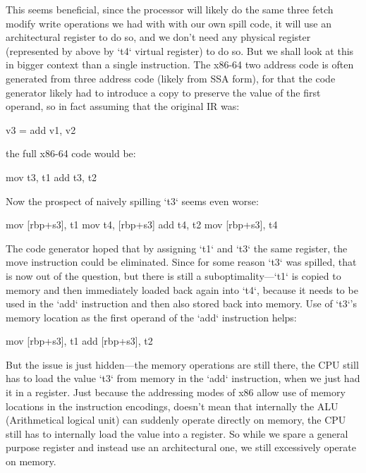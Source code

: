This seems beneficial, since the processor will likely do the same three fetch modify
write operations we had with with our own spill code, it will use an
architectural register to do so, and we don't need any physical register
(represented by above by `t4` virtual register) to do so. But we shall look at
this in bigger context than a single instruction. The x86-64 two address code is
often generated from three address code (likely from SSA form), for that the
code generator likely had to introduce a copy to preserve the value of the first
operand, so in fact assuming that the original IR was:

\begtt
v3 = add v1, v2
\endtt

the full x86-64 code would be:

\begtt
mov t3, t1
add t3, t2
\endtt

Now the prospect of naively spilling `t3` seems even worse:

\begtt
mov [rbp+s3], t1
mov t4, [rbp+s3]
add t4, t2
mov [rbp+s3], t4
\endtt

The code generator hoped that by assigning `t1` and `t3` the same register, the
move instruction could be eliminated. Since for some reason `t3` was spilled,
that is now out of the question, but there is still a suboptimality---`t1` is
copied to memory and then immediately loaded back again into `t4`, because it
needs to be used in the `add` instruction and then also stored back into memory.
Use of `t3`'s memory location as the first operand of the `add` instruction
helps:

\begtt
mov [rbp+s3], t1
add [rbp+s3], t2
\endtt

But the issue is just hidden---the memory operations are still
there, the CPU still has to load the value `t3` from memory in the `add`
instruction, when we just had it in a register. Just because the addressing
modes of x86 allow use of memory locations in the instruction encodings, doesn't
mean that internally the ALU (Arithmetical logical unit) can suddenly operate
directly on memory, the CPU still has to internally load the value into a
register. So while we spare a general purpose register and instead use an
architectural one, we still excessively operate on memory.

